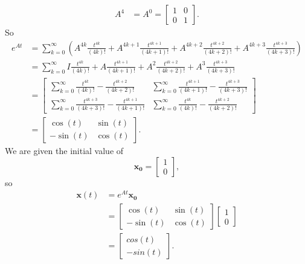 \documentclass{article}
\begin{document}
\begin{itemize}
\begin{align*}
			A^4 &= A^0 =
			\begin{bmatrix}
				 1 &  0 \\
				 0 &  1
			\end{bmatrix}.
		\end{align*}
		So
		\begin{align*}
			e^{At} &= \sum_{k = 0}^{\infty}
			(A^{4k} \frac{t^{4k}}{(4k)!} +
			A^{4k+1} \frac{t^{4k+1}}{(4k + 1)!} +
			A^{4k+2} \frac{t^{4k+2}}{(4k + 2)!} +
			A^{4k+3} \frac{t^{4k+3}}{(4k + 3)!}) \\
			&= \sum_{k = 0}^{\infty}
			I \frac{t^{4k}}{(4k)!} +
			A \frac{t^{4k+1}}{(4k + 1)!} +
			A^{2} \frac{t^{4k+2}}{(4k + 2)!} +
			A^{3} \frac{t^{4k+3}}{(4k + 3)!} \\
			&= \begin{bmatrix}
				\sum_{k=0}^{\infty} \frac{t^{4k}}{(4k)!} -
				\frac{t^{4k + 2}}{(4k + 2)!}&
				\sum_{k=0}^{\infty} \frac{t^{4k + 1}}{(4k + 1)!}
				- \frac{t^{4k + 3}}{(4k + 3)!}\\
				\sum_{k=0}^{\infty} \frac{t^{4k + 3}}{(4k +
				3)!}- \frac{t^{4k + 1}}{(4k + 1)!}&
				\sum_{k=0}^{\infty} \frac{t^{4k}}{(4k)!} -
				\frac{t^{4k + 2}}{(4k + 2)!}
			\end{bmatrix} \\
			&= \begin{bmatrix}
				 \cos(t) & \sin(t)\\
				-\sin(t) & \cos(t)
			\end{bmatrix}.
		\end{align*}
		We are given the initial value of
		\[
			\mathbf{x_0} =
			\begin{bmatrix}
				1 \\
				0
			\end{bmatrix},
		\]
		so
		\begin{align*}
			\mathbf{x}(t) &= e^{At} \mathbf{x_0} \\
			&= \begin{bmatrix}
				\cos(t) & \sin(t) \\
				-\sin(t) & \cos(t)
			\end{bmatrix}
			\begin{bmatrix}
				1 \\
				0
			\end{bmatrix} \\
			&= \begin{bmatrix}
				cos(t) \\
				-sin(t)
			\end{bmatrix}.
		\end{align*}


\end{itemize}
\end{document}
